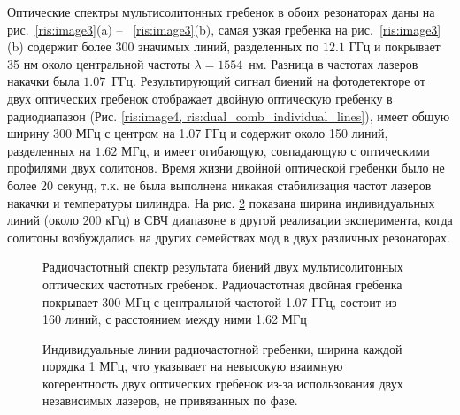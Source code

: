 Оптические спектры мультисолитонных гребенок в обоих резонаторах даны на рис.~\ref{ris:image3}(a) -- ~\ref{ris:image3}(b), самая узкая гребенка на рис.~\ref{ris:image3}(b) содержит более 300 значимых линий, разделенных по $12.1$ ГГц и покрывает 35 нм около центральной частоты $\lambda = 1554$~нм. Разница в частотах лазеров накачки была $1.07$~ГГц. Результирующий сигнал биений на фотодетекторе от двух оптических гребенок отображает двойную оптическую гребенку в радиодиапазон (Рис. \ref{ris:image4, ris:dual_comb_individual_lines}), имеет общую ширину 300 МГц с центром на 1.07 ГГц и содержит около 150 линий, разделенных на $1.62$ МГц, и имеет огибающую, совпадающую с оптическими профилями двух солитонов. Время жизни двойной оптической гребенки было не более 20 секунд, т.к. не была выполнена никакая стабилизация частот лазеров накачки и температуры цилиндра. На рис. \ref{ris:dual_comb_individual_lines} показана ширина индивидуальных линий (около 200 кГц) в СВЧ диапазоне в другой реализации эксперимента, когда солитоны возбуждались на других семействах мод в двух различных резонаторах.

\begin{figure}[ht]
\begin{minipage}[ht]{1\linewidth}
\end{minipage}
\caption{Радиочастотный спектр результата биений двух мультисолитонных оптических частотных гребенок. Радиочастотная двойная гребенка покрывает 300 МГц с центральной частотой 1.07 ГГц, состоит из 160 линий, с расстоянием между ними 1.62 МГц}
\label{ris:image4}
\end{figure}

\begin{figure}[ht]
\begin{minipage}[ht]{1\linewidth}
\end{minipage}
\caption{Индивидуальные линии радиочастотной гребенки, ширина каждой порядка 1 МГц, что указывает на невысокую взаимную когерентность двух оптических гребенок из-за использования двух независимых лазеров, не привязанных по фазе.}
\label{ris:dual_comb_individual_lines}
\end{figure}

